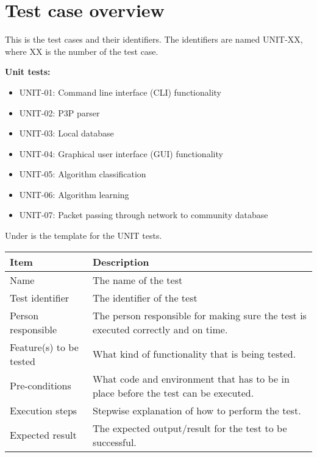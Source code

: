	\section{Test case overview}
		This is the test cases and their identifiers. The identifiers are named UNIT-XX, where XX is the number of the test case.
		\vspace{8 mm}
		
		\textbf{Unit tests:}
		\begin{itemize}
			\renewcommand{\labelitemi}{$\bullet$}
				\item UNIT-01: Command line interface (CLI) functionality
				\item UNIT-02: P3P parser
				\item UNIT-03: Local database
				\item UNIT-04: Graphical user interface (GUI) functionality
				\item UNIT-05: Algorithm classification
				\item UNIT-06: Algorithm learning
				\item UNIT-07: Packet passing through network to community database
		\end{itemize}

		Under is the template for the UNIT tests.
		\begin{center}
			\begin{tabular}{ |  p{4cm} | p{10cm} | }
				\hline
				Item & Description \\ [3pt] \hline \hline
				Name & The name of the test \\  [3pt] \hline
				Test identifier & The identifier of the test \\  [3pt] \hline
				Person responsible & The person responsible for making sure the test is executed correctly and on time. \\  [3pt] \hline
				Feature(s) to be tested & What kind of functionality that is being tested. \\  [3pt] \hline
				Pre-conditions & What code and environment that has to be in place before the test can be executed. \\  [3pt] \hline
				Execution steps & Stepwise explanation of how to perform the test. \\  [3pt] \hline
				Expected result & The expected output/result for the test to be successful. \\  [3pt] \hline
			\end{tabular}
		\end{center}

